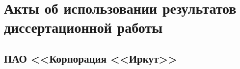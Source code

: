 \chapter{Акты об использовании результатов диссертационной работы} \label{struct:acts} 





\section{ПАО <<Корпорация <<Иркут>>}